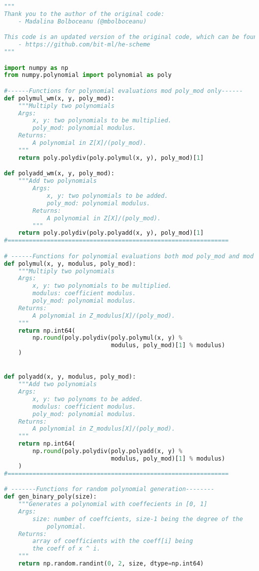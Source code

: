 \documentclass{article}
\begin{document}
\begin{lstlisting}[language=Python]
"""
Thank you to the author of the original code:
    - Madalina Bolboceanu (@mbolboceanu)

This code is an updated version of the original code, which can be found here:
    - https://github.com/bit-ml/he-scheme
"""

import numpy as np
from numpy.polynomial import polynomial as poly

#------Functions for polynomial evaluations mod poly_mod only------
def polymul_wm(x, y, poly_mod):
    """Multiply two polynomials
    Args:
        x, y: two polynomials to be multiplied.
        poly_mod: polynomial modulus.
    Returns:
        A polynomial in Z[X]/(poly_mod).
    """
    return poly.polydiv(poly.polymul(x, y), poly_mod)[1]

def polyadd_wm(x, y, poly_mod):
    """Add two polynomials
        Args:
            x, y: two polynomials to be added.
            poly_mod: polynomial modulus.
        Returns:
            A polynomial in Z[X]/(poly_mod).
        """
    return poly.polydiv(poly.polyadd(x, y), poly_mod)[1]
#==============================================================

# ------Functions for polynomial evaluations both mod poly_mod and mod q-----
def polymul(x, y, modulus, poly_mod):
    """Multiply two polynomials
    Args:
        x, y: two polynomials to be multiplied.
        modulus: coefficient modulus.
        poly_mod: polynomial modulus.
    Returns:
        A polynomial in Z_modulus[X]/(poly_mod).
    """
    return np.int64(
        np.round(poly.polydiv(poly.polymul(x, y) %
                              modulus, poly_mod)[1] % modulus)
    )


def polyadd(x, y, modulus, poly_mod):
    """Add two polynomials
    Args:
        x, y: two polynoms to be added.
        modulus: coefficient modulus.
        poly_mod: polynomial modulus.
    Returns:
        A polynomial in Z_modulus[X]/(poly_mod).
    """
    return np.int64(
        np.round(poly.polydiv(poly.polyadd(x, y) %
                              modulus, poly_mod)[1] % modulus)
    )
#==============================================================

# -------Functions for random polynomial generation--------
def gen_binary_poly(size):
    """Generates a polynomial with coeffecients in [0, 1]
    Args:
        size: number of coeffcients, size-1 being the degree of the
            polynomial.
    Returns:
        array of coefficients with the coeff[i] being
        the coeff of x ^ i.
    """
    return np.random.randint(0, 2, size, dtype=np.int64)



\end{lstlisting}
\end{document}
